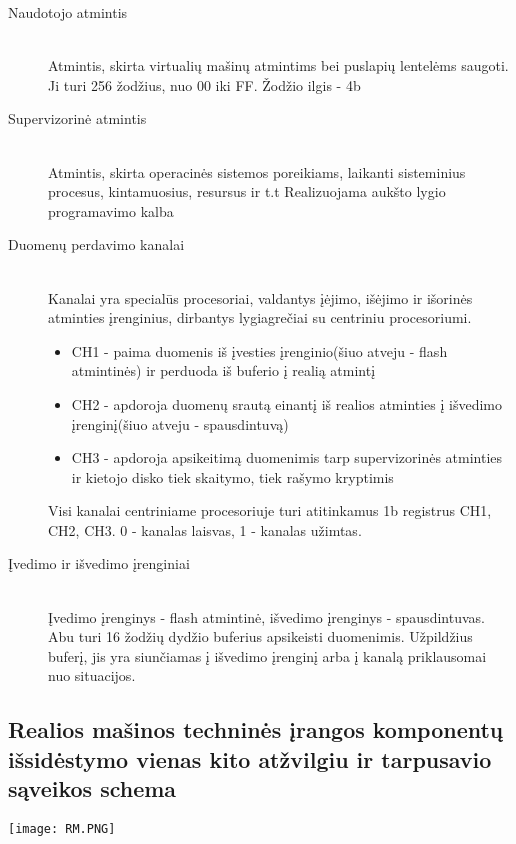 \begin{description}
  \item[Naudotojo atmintis] \leavevmode \\
Atmintis, skirta virtualių mašinų atmintims bei puslapių lentelėms saugoti. Ji turi 256 žodžius, nuo 00 iki FF. Žodžio ilgis - 4b
  \item[Supervizorinė atmintis] \leavevmode \\
Atmintis, skirta operacinės sistemos poreikiams, laikanti sisteminius procesus, kintamuosius, resursus ir t.t Realizuojama aukšto lygio programavimo kalba

  \item[Duomenų perdavimo kanalai] \leavevmode \\
Kanalai yra specialūs procesoriai, valdantys įėjimo, išėjimo ir išorinės atminties įrenginius, dirbantys lygiagrečiai su centriniu procesoriumi.
\begin{itemize}
  \item CH1 - paima duomenis iš įvesties įrenginio(šiuo atveju - flash atmintinės) ir perduoda iš buferio į realią atmintį
  \item CH2 - apdoroja duomenų srautą einantį iš realios atminties į išvedimo įrenginį(šiuo atveju - spausdintuvą)
  \item CH3 - apdoroja apsikeitimą duomenimis tarp supervizorinės atminties ir kietojo disko tiek skaitymo, tiek rašymo kryptimis
\end{itemize}
Visi kanalai centriniame procesoriuje turi atitinkamus 1b registrus CH1, CH2, CH3. 0 - kanalas laisvas, 1 - kanalas užimtas.


  \item[Įvedimo ir išvedimo įrenginiai] \leavevmode \\
Įvedimo įrenginys - flash atmintinė, išvedimo įrenginys - spausdintuvas. Abu turi 16 žodžių dydžio buferius apsikeisti duomenimis. Užpildžius buferį, jis yra siunčiamas
į išvedimo įrenginį arba į kanalą priklausomai nuo situacijos.


\end{description}

\subsection{Realios mašinos techninės įrangos komponentų išsidėstymo vienas kito atžvilgiu ir tarpusavio sąveikos schema}
\texttt{[image: RM.PNG]}
